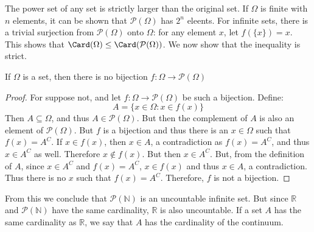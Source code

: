         The power set of any set is strictly larger than the
        original set. If $\Omega$ is finite with $n$ elements, it
        can be shown that $\mathcal{P}(\Omega)$ has $2^{n}$
        eleents. For infinite sets, there is a trivial surjection
        from $\mathcal{P}(\Omega)$ onto $\Omega$: for any element
        $x$, let $f(\{x\})=x$. This shows that
        $\Card(\Omega)\leq\Card(\mathcal{P}(\Omega))$. We now show
        that the inequality is strict.
        \begin{theorem}
            If $\Omega$ is a set, then there is no bijection
            $f:\Omega\rightarrow\mathcal{P}(\Omega)$
        \end{theorem}
        \begin{proof}
            For suppose not, and let
            $f:\Omega\rightarrow\mathcal{P}(\Omega)$ be such a
            bijection. Define:
            \begin{equation}
                A=\{x\in\Omega:x\in{f}(x)\}
            \end{equation}
            Then $A\subseteq\Omega$, and thus
            $A\in\mathcal{P}(\Omega)$. But then the complement of
            $A$ is also an element of $\mathcal{P}(\Omega)$. But
            $f$ is a bijection and thus there is an $x\in\Omega$
            such that $f(x)=A^{C}$. If $x\in{f}(x)$, then
            $x\in{A}$, a contradiction as $f(x)=A^{C}$, and thus
            $x\in{A}^{C}$ as well. Therefore $x\notin{f}(x)$. But
            then $x\in{A}^{C}$. But, from the definition of $A$,
            since $x\in{A}^{C}$ and $f(x)=A^{C}$, $x\in{f}(x)$
            and thus $x\in{A}$, a contradiction. Thus there is no
            $x$ such that $f(x)=A^{C}$. Therefore, $f$ is not a
            bijection.
        \end{proof}
        From this we conclude that $\mathcal{P}(\mathbb{N})$
        is an uncountable infinite set. But since $\mathbb{R}$
        and $\mathcal{P}(\mathbb{N})$ have the same cardinality,
        $\mathbb{R}$ is also uncountable.
        If a set $A$ has the same cardinality as $\mathbb{R}$,
        we say that $A$ has the cardinality of the continuum.
